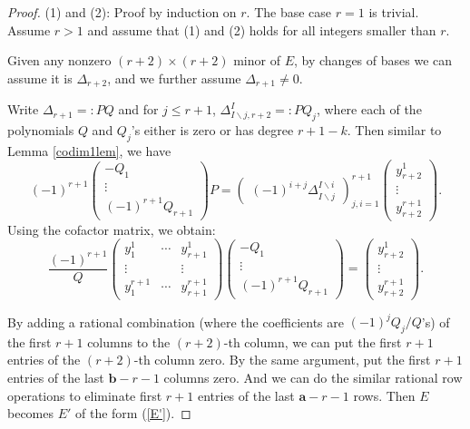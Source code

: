 \documentclass[10pt]{article} %
\newcommand{\aaa}{\mathbf{a}}
\newcommand{\bbb}{\mathbf{b}}
\theoremstyle{definition}
\begin{document}
\begin{proof}
(1) and (2): Proof by induction on $r$. The base case $r=1$ is trivial. Assume $r>1$ and assume that (1) and (2) holds for all integers smaller than $r$.

Given any nonzero $(r+2)\times(r+2)$ minor of $E$, by changes of bases we can assume it is $\Delta_{r+2}$, and we further assume $\Delta_{r+1}\neq 0$.

Write $\Delta_{r+1}=:PQ$ and for $j\leq r+1$, $\Delta^{I}_{I\backslash j, r+2}=:PQ_j$, where each of the polynomials $Q$ and $Q_j$'s either is zero or has degree $r+1-k$. Then similar to Lemma \ref{codim1lem}, we have
$$
(-1)^{r+1}\begin{pmatrix}
-Q_1\\
\vdots\\
(-1)^{r+1} Q_{r+1}
\end{pmatrix}P=
\begin{pmatrix}
(-1)^{i+j}\Delta^{I\backslash i}_{I\backslash j}
\end{pmatrix}_{j,i=1}^{r+1}
\begin{pmatrix}
y^1_{r+2}\\
\vdots\\
y^{r+1}_{r+2}
\end{pmatrix}
.$$
Using the cofactor matrix, we obtain:
$$\frac{(-1)^{r+1}}{Q}
\begin{pmatrix}
y^1_1&\cdots&y^1_{r+1}\\
\vdots & &\vdots\\
y^{r+1}_1&\cdots&y^{r+1}_{r+1}
\end{pmatrix}
\begin{pmatrix}
-Q_1\\
\vdots\\
(-1)^{r+1} Q_{r+1}
\end{pmatrix}=
\begin{pmatrix}
y^1_{r+2}\\
\vdots\\
y^{r+1}_{r+2}
\end{pmatrix}.$$

By adding a rational combination (where the coefficients are $(-1)^{j}Q_j/Q$'s) of the first $r+1$ columns to the $(r+2)$-th column, we can put the first $r+1$ entries of the $(r+2)$-th column zero. By the same argument, put the first $r+1$ entries of the last $\bbb-r-1$ columns zero. And we can do the similar rational row operations to eliminate first $r+1$ entries of the last $\aaa-r-1$ rows. Then $E$ becomes $E'$ of the form (\ref{E'}). 


\end{proof}
\end{document}

